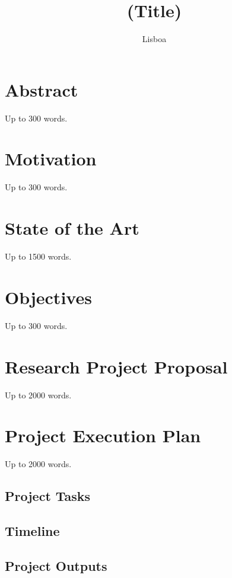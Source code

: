 \documentclass{article}
\title{(Title)}
\date{Lisboa}{Month}{Day}{Year}
\begin{document}
\section*{Abstract}

Up to 300 words.





\section*{Motivation}

Up to 300 words.





\section*{State of the Art}

Up to 1500 words.





\section*{Objectives}

Up to 300 words.





\section*{Research Project Proposal}

Up to 2000 words.





\section*{Project Execution Plan}

Up to 2000 words.

\subsection*{Project Tasks}


\subsection*{Timeline}


\subsection*{Project Outputs}
\end{document}
